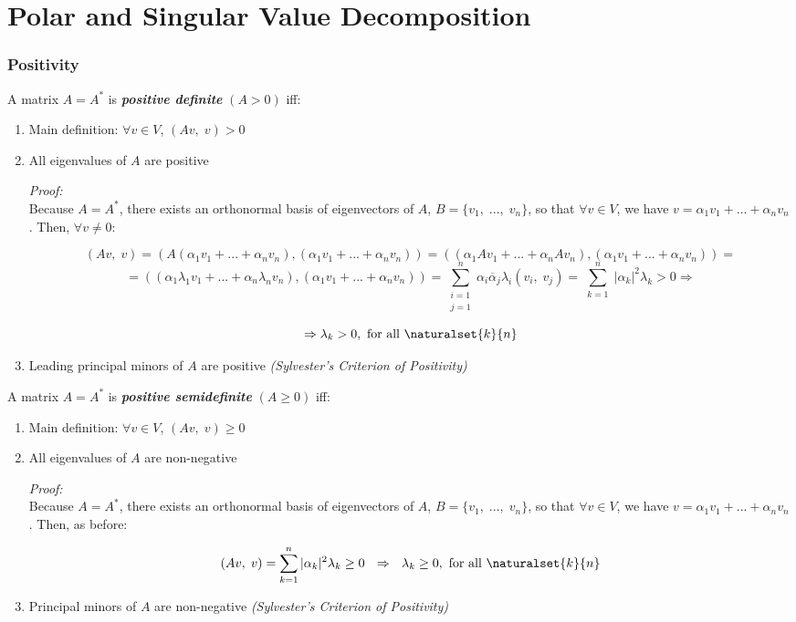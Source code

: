 \section*{Polar and Singular Value Decomposition}

\subsubsection*{Positivity}

A matrix $A=A^*$ is \textit{\textbf{positive definite}} $(A>0)$ iff:

\begin{enumerate}[label=(\roman*)]
    \item Main definition: $\forall v \in V$, $(Av,\;v)>0$
    \item All eigenvalues of $A$ are positive
    
    \textit{Proof:}\\
    Because $A=A^*$, there exists an orthonormal basis of eigenvectors of $A$, $B=\{v_1,\;...,\;v_n\}$, so that $\forall v \in V$, we have $v=\alpha_1 v_1+...+\alpha_n v_n$. Then, $\forall v\neq 0$:
    
    $$(Av,\;v)=\left(A(\alpha_1 v_1+...+\alpha_n v_n),(\alpha_1 v_1+...+\alpha_n v_n)\right)=\left((\alpha_1 Av_1+...+\alpha_n Av_n),(\alpha_1 v_1+...+\alpha_n v_n)\right)=$$
    $$=\left((\alpha_1 \lambda_1v_1+...+\alpha_n \lambda_nv_n),(\alpha_1 v_1+...+\alpha_n v_n)\right)=\sum_{\substack{i=1\\j=1}}^n\alpha_i\overline{\alpha}_j\lambda_i(v_i,\;v_j)=\sum_{\substack{k=1}}^n|\alpha_k|^2\lambda_k>0\Rightarrow$$
    
    $$\Rightarrow \lambda_k>0, \text{ for all }\naturalset{k}{n}$$
    
    \item Leading principal minors of $A$ are positive \textit{(Sylvester's Criterion of Positivity)}
\end{enumerate}

A matrix $A=A^*$ is \textit{\textbf{positive semidefinite}} $(A\geq0)$ iff:

\begin{enumerate}[label=(\roman*)]
    \item Main definition: $\forall v \in V$, $(Av,\;v)\geq0$
    \item All eigenvalues of $A$ are non-negative
    
    \textit{Proof:}\\
    Because $A=A^*$, there exists an orthonormal basis of eigenvectors of $A$, $B=\{v_1,\;...,\;v_n\}$, so that $\forall v \in V$, we have $v=\alpha_1 v_1+...+\alpha_n v_n$. Then, as before:
    
    $$(Av,\;v)=\sum_{\substack{k=1}}^n|\alpha_k|^2\lambda_k \geq 0 \text{ }\text{ } \Rightarrow \text{ }\text{ } \lambda_k \geq 0, \text{ for all }\naturalset{k}{n}$$
    
    \item Principal minors of $A$ are non-negative \textit{(Sylvester's Criterion of Positivity)}
\end{enumerate}

